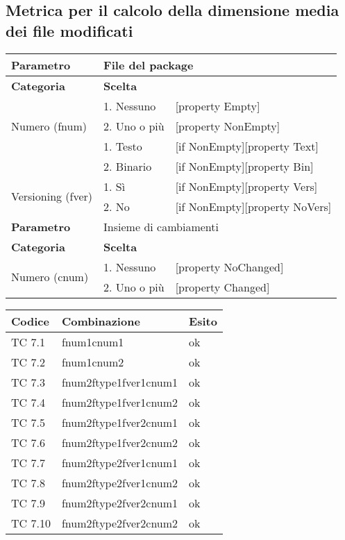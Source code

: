 \subsection{Metrica per il calcolo della dimensione media dei file modificati}

\begin{tabular}{|p{4cm}|p{4cm}p{5cm}|}
	\hline
	\cellcolor{Gray} \textbf{Parametro}				& \multicolumn{2}{l|}{File del package}							\tabularnewline
	\hline
	\rowcolor{Gray}
	\textbf{Categoria}						& \textbf{Scelta}			&						\tabularnewline
	\hline
	\multirow{3}{*}{Numero (fnum)}					& 1. Nessuno				&	[property Empty] 			\tabularnewline
									\cline{2-3}
									& 2. Uno o più				&	[property NonEmpty]			\tabularnewline
	\hline
	\multirow{2}{*}{Tipo (ftype)}					& 1. Testo				&	[if NonEmpty][property Text] 		\tabularnewline
									\cline{2-3}
									& 2. Binario				&	[if NonEmpty][property Bin]		\tabularnewline
	\hline
	\multirow{2}{*}{Versioning (fver)}				& 1. Sì					&	[if NonEmpty][property Vers] 		\tabularnewline
									\cline{2-3}
									& 2. No					&	[if NonEmpty][property NoVers]		\tabularnewline
	\hline
	
	\cellcolor{Gray} \textbf{Parametro}				& \multicolumn{2}{l|}{Insieme di cambiamenti}						\tabularnewline
	\hline
	\rowcolor{Gray}
	\textbf{Categoria}						& \textbf{Scelta}			&						\tabularnewline
	\hline
	\multirow{3}{*}{Numero (cnum)}					& 1. Nessuno				&	[property NoChanged] 			\tabularnewline
									\cline{2-3}
									& 2. Uno o più				&	[property Changed]			\tabularnewline
	\hline
\end{tabular}

\vspace{1cm}

\begin{tabular}{|p{3cm}|p{7cm}|p{3cm}|}
	\hline
	\rowcolor{Gray}
	\textbf{Codice} & \textbf{Combinazione} & \textbf{Esito}\tabularnewline
	\hline
	TC 7.1			& fnum1cnum1			& ok \tabularnewline
	\hline
	TC 7.2			& fnum1cnum2			& ok \tabularnewline
	\hline
	TC 7.3			& fnum2ftype1fver1cnum1		& ok \tabularnewline
	\hline
	TC 7.4			& fnum2ftype1fver1cnum2		& ok \tabularnewline
	\hline
	TC 7.5			& fnum2ftype1fver2cnum1		& ok \tabularnewline
	\hline
	TC 7.6			& fnum2ftype1fver2cnum2		& ok \tabularnewline
	\hline
	TC 7.7			& fnum2ftype2fver1cnum1		& ok \tabularnewline
	\hline
	TC 7.8			& fnum2ftype2fver1cnum2		& ok \tabularnewline
	\hline
	TC 7.9			& fnum2ftype2fver2cnum1		& ok \tabularnewline
	\hline
	TC 7.10			&fnum2ftype2fver2cnum2		& ok \tabularnewline
	\hline
\end{tabular}
\clearpage




